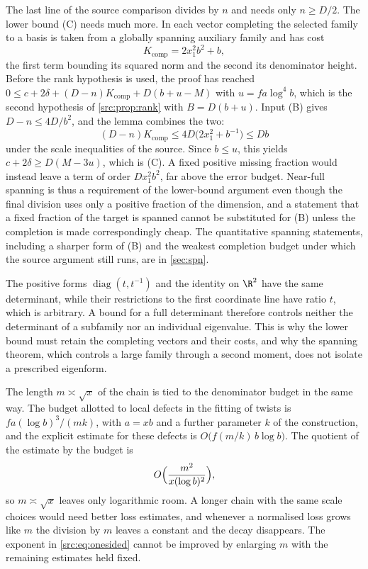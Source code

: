 The last line of the source comparison divides by $n$ and needs only $n\ge D/2$. The lower
bound (C) needs much more. In  each vector completing the selected
family to a basis is taken from a globally spanning auxiliary family and has cost
\[
K_{\mathrm{comp}}=2x_1^2b^2+b ,
\]
the first term bounding its squared norm and the second its denominator height. Before the
rank hypothesis is used, the proof has reached
$0\le c+2\delta+(D-n)K_{\mathrm{comp}}+D(b+u-M)$ with $u=fa\log^4b$, which is the second
hypothesis of \cref{src:prop:rank} with $B=D(b+u)$. Input (B) gives $D-n\le4D/b^2$, and the
lemma  combines the two:
\[
(D-n)K_{\mathrm{comp}}\le4D\bigl(2x_1^2+b^{-1}\bigr)\le Db
\]
under the scale inequalities of the source. Since $b\le u$, this yields
$c+2\delta\ge D(M-3u)$, which is (C). A fixed positive missing fraction would instead leave a
term of order $Dx_1^2b^2$, far above the error budget. Near-full spanning is thus a
requirement of the lower-bound argument even though the final division uses only a positive
fraction of the dimension, and a statement that a fixed fraction of the target is spanned
cannot be substituted for (B) unless the completion is made correspondingly cheap. The
quantitative spanning statements, including a sharper form of (B) and the weakest completion
budget under which the source argument still runs, are in \cref{sec:spn}.

\begin{example}\label{src:ex:diag}
The positive forms $\operatorname{diag}(t,t^{-1})$ and the identity on $\R^2$ have the same
determinant, while their restrictions to the first coordinate line have ratio $t$, which is
arbitrary. A bound for a full determinant therefore controls neither the determinant of a
subfamily nor an individual eigenvalue. This is why the lower bound must retain the completing
vectors and their costs, and why the spanning theorem, which controls a large family through
a second moment, does not isolate a prescribed eigenform.
\end{example}

The length $m\asymp\sqrt x$ of the chain is tied to the denominator budget in the same way.
The budget allotted to local defects in the fitting of twists is $fa(\log b)^3/(mk)$, with
$a=xb$ and a further parameter $k$ of the construction, and the explicit estimate for these
defects is $O\bigl(f(m/k)\,b\log b\bigr)$. The quotient of the estimate by the budget is
\begin{equation}\label{src:eq:budget-ratio}
O\Bigl(\frac{m^2}{x(\log b)^2}\Bigr),
\end{equation}
so $m\asymp\sqrt x$ leaves only logarithmic room. A longer chain with the same scale choices
would need better loss estimates, and whenever a normalised loss grows like $m$ the division
by $m$ leaves a constant and the decay disappears. The exponent in \eqref{src:eq:onesided}
cannot be improved by enlarging $m$ with the remaining estimates held fixed.

